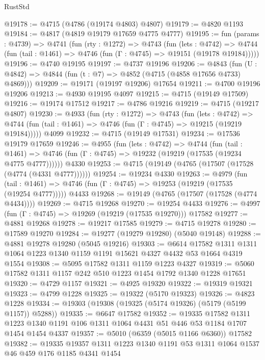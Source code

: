 \begin{lexlean}{RustStd}
\begin{coremodule}
@19178 := @4715 (@4786 (@19174 @4803) @4807)
@19179 := @4820 @1193
@19184 := @4817 (@4819 @19179 @17659 @4775 @4777)
@19195 := fun (params : @4739) =>
  @4741
    (fun (rty : @1272) =>
    @4743
      (fun (lets : @4742) =>
      @4744 (fun (tail : @1461) => @4746 (fun (Γ : @4745) => @19151 (@19178 @19184)))))
@19196 := @4740 @19195
@19197 := @4737 @19196
@19206 := @4843
    (fun (U : @4842) => @4844 (fun (t : @7) => @4852 (@4715 (@4858 @17656 @4733) @4869)))
@19209 := @19171 (@19197 @19206) @17654
@19211 := @4700 @19196 @19206
@19213 := @4930 @19195 @4097
@19215 := @4715 (@19149 @17509)
@19216 := @19174 @17512
@19217 := @4786 @19216
@19219 := @4715 (@19217 @4807)
@19230 := @4933
    (fun (rty : @1272) =>
    @4743
      (fun (lets : @4742) =>
      @4744 (fun (tail : @1461) => @4746 (fun (Γ : @4745) => @19215 (@19219 @19184)))))
    @4099
@19232 := @4715 (@19149 @17531)
@19234 := @17536 @19179 @17659
@19246 := @4955
    (fun (lets : @4742) =>
    @4744
      (fun (tail : @1461) =>
      @4746 (fun (Γ : @4745) => @19232 (@19219 (@17535 (@19234 @4775 @4777))))))
    @4330
@19253 := @4715 (@19149 (@4765 (@17507 (@17528 (@4774 (@4331 @4777))))))
@19254 := @19234 @4330
@19263 := @4979
    (fun (tail : @1461) => @4746 (fun (Γ : @4745) => @19253 (@19219 (@17535 (@19254 @4777)))))
    @4433
@19268 := @19149 (@4765 (@17507 (@17528 (@4774 @4434))))
@19269 := @4715 @19268
@19270 := @19254 @4433
@19276 := @4997 (fun (Γ : @4745) => @19269 (@19219 (@17535 @19270))) @17582
@19277 := @4881 @19268
@19278 := @19217 @17585
@19279 := @4715 @19278
@19280 := @17589 @19270
@19284 := @19277 (@19279 @19280) (@5040 @19148)
@19288 := @4881 @19278 @19280 (@5045 @19216)
@19303 := @6614
    @17582
    @1311
    @1311
    @1064
    @1223
    @1340
    @1159
    @1191
    @15621
    @4327
    @4432
    @53
    @1664
    @4319
    @1554
@19308 := @5095 @17582 @1311 @1159 @1223 @4327
@19319 := @5060 @17582 @1311 @1157 @242 @510 @1223 @1454 @1792 @1340 @1228 @17651
@19320 := @4729 @1157
@19321 := @4925 @19320
@19322 := @19319 @19321
@19323 := @4799 @1228
@19325 := @19322 (@5170 @19323)
@19326 := @4823 @1228
@19334 := @19303 (@19308 (@19325 (@5174 @19326) (@5179 (@5199 @1157)) @5288))
@19335 := @6647 @17582
@19352 := @19335
    @17582
    @1311
    @1223
    @1340
    @1191
    @106
    @1311
    @1064
    @4431
    @51
    @446
    @53
    @1184
    @1707
    @1454
    @1454
    @4337
@19357 := @5010 (@6359 (@5015 @1166 @6360)) @17582
@19382 := @19335
    @19357
    @1311
    @1223
    @1340
    @1191
    @53
    @1311
    @1064
    @1537
    @46
    @459
    @176
    @1185
    @4341
    @1454

\end{coremodule}
\end{lexlean}
